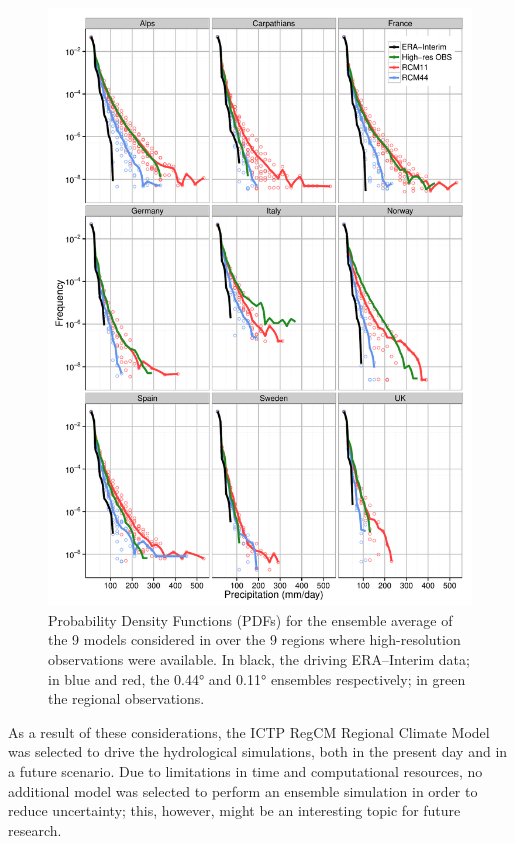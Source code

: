 \begin{figure}
    \centering
    \includegraphics[width=\textwidth]{figures/AV_PDF}
    \decoRule
    \caption[PDFs for CORDEX models, from \citet{Fantini2016}]{Probability Density Functions (PDFs) for the ensemble average of the 9 models considered in \citet{Fantini2016} over the 9 regions where high-resolution observations were available. In black, the driving ERA--Interim data; in blue and red, the \ang{0.44} and \ang{0.11} ensembles respectively; in green the regional observations.} \label{fig:added_value_pdf}
\end{figure}
As a result of these considerations, the ICTP RegCM Regional Climate Model was selected to drive the hydrological simulations, both in the present day and in a future scenario. Due to limitations in time and computational resources, no additional model was selected to perform an ensemble simulation in order to reduce uncertainty; this, however, might be an interesting topic for future research.

